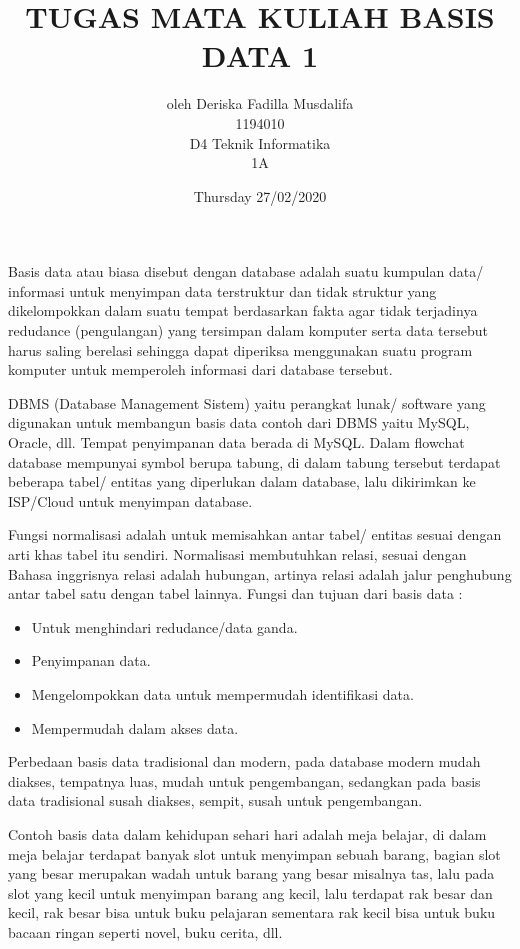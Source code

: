 \documentclass[12pt]{article}
\author{oleh Deriska Fadilla Musdalifa\\1194010\\D4 Teknik Informatika\\1A}
\date{Thursday 27/02/2020}
\title{TUGAS MATA KULIAH BASIS DATA 1}
\begin{document}
\maketitle
Basis data atau biasa disebut dengan database adalah suatu kumpulan data/ informasi untuk menyimpan data terstruktur dan tidak struktur yang dikelompokkan dalam suatu tempat berdasarkan fakta agar tidak terjadinya redudance (pengulangan) yang tersimpan dalam komputer serta data tersebut harus saling berelasi sehingga dapat diperiksa menggunakan suatu program komputer untuk memperoleh informasi dari database tersebut. 

DBMS (Database Management Sistem) yaitu perangkat lunak/ software yang digunakan untuk membangun basis data contoh dari DBMS yaitu MySQL, Oracle, dll. Tempat penyimpanan data berada di MySQL. Dalam flowchat database mempunyai symbol berupa tabung, di dalam tabung tersebut terdapat beberapa tabel/ entitas yang diperlukan dalam database, lalu dikirimkan ke ISP/Cloud untuk menyimpan database. 

Fungsi normalisasi adalah untuk memisahkan antar tabel/ entitas sesuai dengan arti khas tabel itu sendiri. Normalisasi membutuhkan relasi, sesuai dengan Bahasa inggrisnya relasi adalah hubungan, artinya relasi adalah jalur penghubung antar tabel satu dengan tabel lainnya. 
Fungsi dan tujuan dari basis data : 

\begin{itemize}
  \item Untuk menghindari redudance/data ganda.
  \item Penyimpanan data.
  \item Mengelompokkan data untuk mempermudah identifikasi data.
  \item Mempermudah dalam akses data.
\end{itemize}

Perbedaan basis data tradisional dan modern, pada database modern mudah diakses, tempatnya luas, mudah untuk pengembangan, sedangkan pada basis data tradisional susah diakses, sempit, susah untuk pengembangan.

Contoh basis data dalam kehidupan sehari hari adalah meja belajar, di dalam meja belajar terdapat banyak slot untuk menyimpan sebuah barang, bagian slot yang besar merupakan wadah untuk barang yang besar misalnya tas, lalu pada slot yang kecil untuk menyimpan barang ang kecil, lalu terdapat rak besar dan kecil, rak besar bisa untuk buku pelajaran sementara rak kecil bisa untuk buku bacaan ringan seperti novel, buku cerita, dll. 
\end{document}
